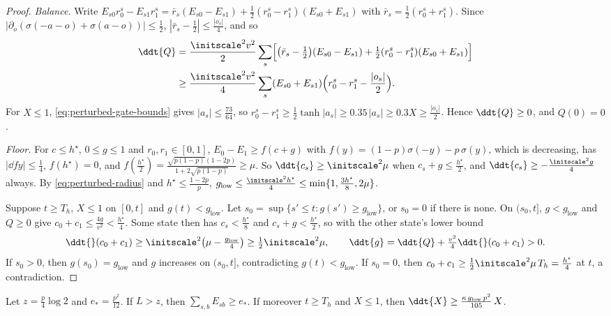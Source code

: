 \begin{proof}
\emph{Balance.} Write $E_{s0}r^s_0-E_{s1}r^s_1=\bar r_s(E_{s0}-E_{s1})+\frac12(r^s_0-r^s_1)(E_{s0}+E_{s1})$ with $\bar r_s=\frac12(r^s_0+r^s_1)$.
Since $|\partial_o(\sigma(-a-o)+\sigma(a-o))|\le\frac12$, $|\bar r_s-\frac12|\le\frac{|o_s|}4$, and so
\[
 \begin{aligned}
 \ddt{Q}&=\frac{\initscale^2v^2}2\sum_s\Bigl[
 \bigl(\bar r_s-\tfrac12\bigr)(E_{s0}-E_{s1})
 +\tfrac12(r^s_0-r^s_1)(E_{s0}+E_{s1})\Bigr]\\
 &\ge\frac{\initscale^2v^2}4\sum_s(E_{s0}+E_{s1})
 \Bigl(r^s_0-r^s_1-\frac{|o_s|}2\Bigr).
 \end{aligned}
\]
For $X\le1$, \cref{eq:perturbed-gate-bounds} gives $|a_s|\le\frac{73}{64}$, so $r^s_0-r^s_1\ge\frac12\tanh|a_s|\ge0.35\,|a_s|\ge0.3X\ge\frac{|o_s|}2$.
Hence $\ddt{Q}\ge0$, and $Q(0)=0$.

\emph{Floor.} For $c\le h^\star$, $0\le g\le1$ and $r_0,r_1\in[0,1]$, $E_0-E_1\ge f(c+g)$ with $f(y)=(1-p)\sigma(-y)-p\,\sigma(y)$, which is
decreasing, has $|\dd{f}{y}|\le\frac14$, $f(h^\star)=0$, and
$f(\frac{h^\star}2)=\frac{\sqrt{p(1-p)}(1-2p)}{1+2\sqrt{p(1-p)}}\ge\mu$. So $\ddt{c_s}\ge\initscale^2\mu$ when $c_s+g\le\frac{h^\star}2$, and
$\ddt{c_s}\ge-\frac{\initscale^2g}4$ always. By \cref{eq:perturbed-radius} and $h^\star\le\frac{1-2p}{p}$,
$g_{\mathrm{low}}\le\frac{\initscale^2h^\star}4\le\min\{1,\frac{3h^\star}8,2\mu\}$.

Suppose $t\ge T_h$, $X\le1$ on $[0,t]$ and $g(t)<g_{\mathrm{low}}$. Let $s_0=\sup\{s'\le t:g(s')\ge g_{\mathrm{low}}\}$, or $s_0=0$ if there is none.
On $(s_0,t]$, $g<g_{\mathrm{low}}$ and $Q\ge0$ give $c_0+c_1\le\frac{4g}{v^2}<\frac{h^\star}4$. Some state then has $c_s<\frac{h^\star}8$ and
$c_s+g<\frac{h^\star}2$, so with the other state's lower bound
\[
 \ddt{}(c_0+c_1)\ge\initscale^2\bigl(\mu-\tfrac{g_{\mathrm{low}}}4\bigr)\ge\tfrac12\initscale^2\mu,\qquad
 \ddt{g}=\ddt{Q}+\tfrac{v^2}4\ddt{}(c_0+c_1)>0 .
\]
If $s_0>0$, then $g(s_0)=g_{\mathrm{low}}$ and $g$ increases on $(s_0,t]$, contradicting $g(t)<g_{\mathrm{low}}$. If $s_0=0$, then
$c_0+c_1\ge\frac12\initscale^2\mu\,T_h=\frac{h^\star}4$ at $t$, a contradiction.
\end{proof}

\begin{lemma}
\label{lem:perturbed-grow}
Let $z=\frac p4\log2$ and $e_\ast=\frac{p^2}{12}$. If $L>z$, then $\sum_{s,b}E_{sb}\ge e_\ast$. If moreover $t\ge T_h$ and $X\le1$, then
$\ddt{X}\ge\frac{\kappa\,g_{\mathrm{low}}\,p^2}{105}\,X$.
\end{lemma}

